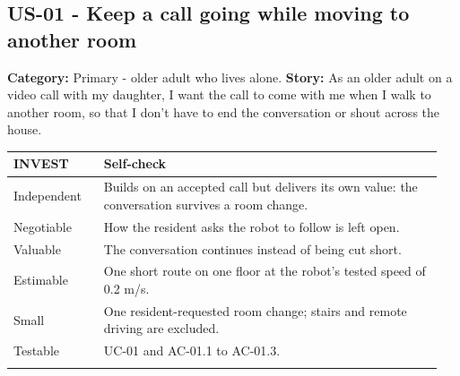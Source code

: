 \documentclass[12pt,letterpaper]{article}
\begin{document}
\par\medskip
\begin{minipage}{\linewidth}
\subsection*{US-01 - Keep a call going while moving to another room}

\textbf{Category:} Primary - older adult who lives alone. \textbf{Story:} As an older adult on a video call with my daughter, I want the call to come with me when I walk to another room, so that I don't have to end the conversation or shout across the house.

\begingroup\small

\begin{tabular}{@{}>{\RaggedRight\arraybackslash}p{0.2\linewidth}>{\RaggedRight\arraybackslash}p{0.75\linewidth}@{}}

\toprule\textbf{INVEST} & \textbf{Self-check}\\\midrule

Independent & Builds on an accepted call but delivers its own value: the conversation survives a room change. \\ \addlinespace[3pt]

Negotiable & How the resident asks the robot to follow is left open. \\ \addlinespace[3pt]

Valuable & The conversation continues instead of being cut short. \\ \addlinespace[3pt]

Estimable & One short route on one floor at the robot's tested speed of 0.2 m/s. \\ \addlinespace[3pt]

Small & One resident-requested room change; stairs and remote driving are excluded. \\ \addlinespace[3pt]

Testable & UC-01 and AC-01.1 to AC-01.3. \\ \addlinespace[3pt]

\bottomrule
\end{tabular}

\endgroup
\end{minipage}
\par\medskip
\end{document}
